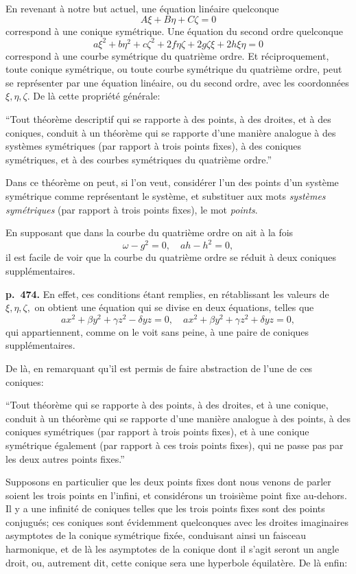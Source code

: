 \documentclass[11pt]{article}
\begin{document}
En revenant \`a notre but actuel, une \'equation lin\'eaire quelconque
\[ A\xi + B\eta + C\zeta = 0 \]
correspond \`a une conique sym\'etrique. Une \'equation du second ordre quelconque
\[ a\xi^2 + b\eta^2 + c\zeta^2 + 2f\eta\zeta + 2g\zeta\xi + 2h\xi\eta = 0 \]
correspond \`a une courbe sym\'etrique du quatri\`eme ordre. Et r\'eciproquement, toute conique sym\'etrique, ou toute courbe sym\'etrique du quatri\`eme ordre, peut se repr\'esenter par une \'equation lin\'eaire, ou du second ordre, avec les coordonn\'ees $\xi, \eta, \zeta$. De l\`a cette propri\'et\'e g\'en\'erale:

``Tout th\'eor\`eme descriptif qui se rapporte \`a des points, \`a des droites, et \`a des coniques, conduit \`a un th\'eor\`eme qui se rapporte d'une mani\`ere analogue \`a des syst\`emes sym\'etriques (par rapport \`a trois points fixes), \`a des coniques sym\'etriques, et \`a des courbes sym\'etriques du quatri\`eme ordre.''

Dans ce th\'eor\`eme on peut, si l'on veut, consid\'erer l'un des points d'un syst\`eme sym\'etrique comme repr\'esentant le syst\`eme, et substituer aux mots \textit{syst\`emes sym\'etriques} (par rapport \`a trois points fixes), le mot \textit{points}.

En supposant que dans la courbe du quatri\`eme ordre on ait \`a la fois
\[ \omega - g^2 = 0,\quad ah - h^2 = 0, \]
il est facile de voir que la courbe du quatri\`eme ordre se r\'eduit \`a deux coniques suppl\'ementaires.

\bigskip
\noindent\textbf{p.~474.} En effet, ces conditions \'etant remplies, en r\'etablissant les valeurs de $\xi, \eta, \zeta,$ on obtient une \'equation qui se divise en deux \'equations, telles que
\[ ax^2 + \beta y^2 + \gamma z^2 - \delta yz = 0,\quad ax^2 + \beta y^2 + \gamma z^2 + \delta yz = 0, \]
qui appartiennent, comme on le voit sans peine, \`a une paire de coniques suppl\'ementaires.

De l\`a, en remarquant qu'il est permis de faire abstraction de l'une de ces coniques:

``Tout th\'eor\`eme qui se rapporte \`a des points, \`a des droites, et \`a une conique, conduit \`a un th\'eor\`eme qui se rapporte d'une mani\`ere analogue \`a des points, \`a des coniques sym\'etriques (par rapport \`a trois points fixes), et \`a une conique sym\'etrique \'egalement (par rapport \`a ces trois points fixes), qui ne passe pas par les deux autres points fixes.''

Supposons en particulier que les deux points fixes dont nous venons de parler soient les trois points en l'infini, et consid\'erons un troisi\`eme point fixe au-dehors. Il y a une infinit\'e de coniques telles que les trois points fixes sont des points conjugu\'es; ces coniques sont \'evidemment quelconques avec les droites imaginaires asymptotes de la conique sym\'etrique fix\'ee, conduisant ainsi un faisceau harmonique, et de l\`a les asymptotes de la conique dont il s'agit seront un angle droit, ou, autrement dit, cette conique sera une hyperbole \'equilat\`ere. De l\`a enfin:
\end{document}
